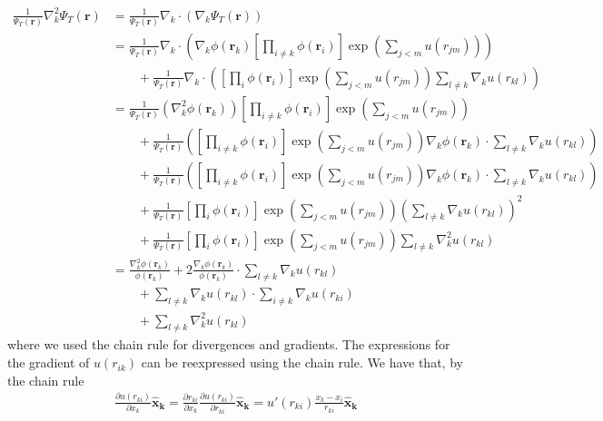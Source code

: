 \documentclass[%
oneside,                 %
final,                   %
10pt]{article}
\begin{document}
\begin{align*}
   \frac{1}{\Psi_T(\mathbf{r})}\nabla_k^2\Psi_T(\mathbf{r}) & = \frac{1}{\Psi_T(\mathbf{r})} \nabla_k \cdot \left(\nabla_k\Psi_T(\mathbf{r})\right) \\
   & = \frac{1}{\Psi_T(\mathbf{r})} \nabla_k \cdot \left(\nabla_k\phi(\mathbf{r}_k)\left[\prod_{i\ne k}\phi(\mathbf{r}_i)\right]\exp{\left(\sum_{j<m}u(r_{jm})\right)}\right)
  \\
  &\qquad
  + \frac{1}{\Psi_T(\mathbf{r})} \nabla_k \cdot \left( \left[\prod_i\phi(\mathbf{r}_i)\right]
  \exp{\left(\sum_{j<m}u(r_{jm})\right)}\sum_{l\ne k}\nabla_k u(r_{kl}) \right) \\ 
  & =  \frac{1}{\Psi_T(\mathbf{r})} \left(\nabla_k^2\phi(\mathbf{r}_k)\right)\left[\prod_{i\ne k}\phi(\mathbf{r}_i)\right]\exp{\left(\sum_{j<m}u(r_{jm})\right)}\\ 
  &\qquad +\frac{1}{\Psi_T(\mathbf{r})}\left(\left[\prod_{i\ne k}\phi(\mathbf{r}_i)\right]\exp{\left(\sum_{j<m}u(r_{jm})\right)}\nabla_k\phi(\mathbf{r}_k) \cdot \sum_{l\ne k}\nabla_k u(r_{kl}) \right)\\
  & \qquad+ \frac{1}{\Psi_T(\mathbf{r})}\left(\left[\prod_{i\ne k}\phi(\mathbf{r}_i)\right]\exp{\left(\sum_{j<m}u(r_{jm})\right)}\nabla_k\phi(\mathbf{r}_k) \cdot \sum_{l\ne k}\nabla_k u(r_{kl}) \right)\\
  & \qquad+\frac{1}{\Psi_T(\mathbf{r})} \left[\prod_i\phi(\mathbf{r}_i)\right]
  \exp{\left(\sum_{j<m}u(r_{jm})\right)}\left(\sum_{l\ne k}\nabla_k u(r_{kl})\right)^2 \\
  & \qquad+\frac{1}{\Psi_T(\mathbf{r})} \left[\prod_i\phi(\mathbf{r}_i)\right]
  \exp{\left(\sum_{j<m}u(r_{jm})\right)}\sum_{l\ne k}\nabla_k^2 u(r_{kl})\\
  & = \frac{\nabla_k^2\phi(\mathbf{r}_k)}{\phi(\mathbf{r}_k)}
   + 2\frac{\nabla_k\phi(\mathbf{r}_k)}{\phi(\mathbf{r}_k)}\cdot 
   \sum_{l\ne k}\nabla_k u(r_{kl})
   \\
   &\qquad
   + \sum_{l\ne k}\nabla_k u(r_{kl}) \cdot \sum_{i\ne k}\nabla_k u(r_{ki})
   \\
   &\qquad
   + \sum_{l\ne k}\nabla_k^2 u(r_{kl})
\end{align*}
where we used the chain rule for divergences and gradients. The expressions for the gradient of $u(r_{ik})$ can be reexpressed using the chain rule.
We have that, by the chain rule
\begin{align*}
    \frac{\partial u(r_{ki})}{\partial x_k}\mathbf{\hat{x}_k}=\frac{\partial r_{ki}}{\partial x_k}\frac{\partial u(r_{ki})}{\partial r_{ki}}\mathbf{\hat{x}_k}=u'(r_{ki})\frac{x_k-x_i}{r_{ki}}\mathbf{\hat{x}_k}
\end{align*}
\end{document}
